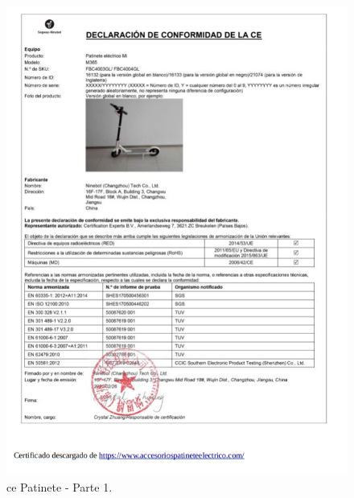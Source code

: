 \begin{figure}[H]
    \centering
    \includegraphics[scale=0.8]{archivos/CE patinete 1.png}
    \caption{\gls{ce} Patinete - Parte 1.}
    \label{fig:CE patinete 1}
\end{figure}

